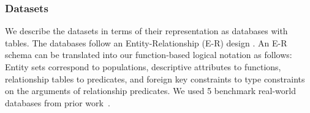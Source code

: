 \documentclass[twoside,11pt]{article}
\begin{document}
\subsubsection{Datasets}

We describe the datasets in terms of their representation as databases with tables. The databases follow an Entity-Relationship (E-R) design \cite{Ullman1982}. An E-R schema can be translated into our function-based logical notation as follows: Entity sets correspond to populations, descriptive attributes to functions, relationship tables to predicates, and foreign key constraints to type constraints on the arguments of relationship predicates.
%
We used %
5 benchmark real-world databases from prior work~\cite{Schulte2012}. 


\end{document}
